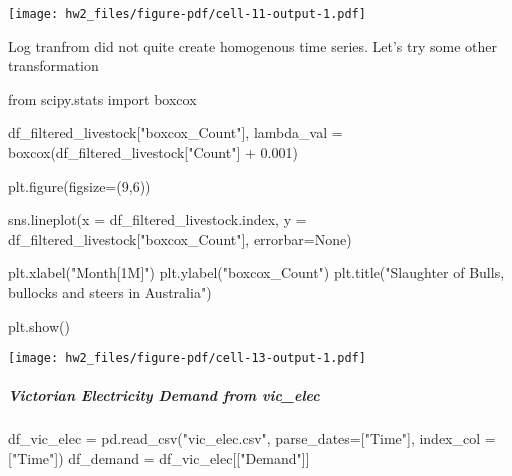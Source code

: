 \documentclass[
  11pt,
]{article}
\let\oldsubparagraph\subparagraph
\renewcommand{\subparagraph}[1]{\oldsubparagraph{#1}\mbox{}}
\newenvironment{Shaded}{\begin{snugshade}}{\end{snugshade}}
\newcommand{\DecValTok}[1]{\textcolor[rgb]{0.68,0.00,0.00}{#1}}
\newcommand{\FloatTok}[1]{\textcolor[rgb]{0.68,0.00,0.00}{#1}}
\newcommand{\ImportTok}[1]{\textcolor[rgb]{0.00,0.46,0.62}{#1}}
\newcommand{\NormalTok}[1]{\textcolor[rgb]{0.00,0.23,0.31}{#1}}
\newcommand{\OperatorTok}[1]{\textcolor[rgb]{0.37,0.37,0.37}{#1}}
\newcommand{\StringTok}[1]{\textcolor[rgb]{0.13,0.47,0.30}{#1}}
\newcommand{\VariableTok}[1]{\textcolor[rgb]{0.07,0.07,0.07}{#1}}
\begin{document}
\texttt{[image: hw2\_files/figure-pdf/cell-11-output-1.pdf]}

Log tranfrom did not quite create homogenous time series. Let's try some
other transformation

\n

\begin{Shaded}
\begin{Highlighting}[]
\ImportTok{from}\NormalTok{ scipy.stats }\ImportTok{import}\NormalTok{ boxcox}

\NormalTok{df\_filtered\_livestock[}\StringTok{"boxcox\_Count"}\NormalTok{], lambda\_val }\OperatorTok{=}\NormalTok{ boxcox(df\_filtered\_livestock[}\StringTok{"Count"}\NormalTok{] }\OperatorTok{+} \FloatTok{0.001}\NormalTok{)}
\end{Highlighting}
\end{Shaded}

\begin{Shaded}
\begin{Highlighting}[]
\NormalTok{plt.figure(figsize}\OperatorTok{=}\NormalTok{(}\DecValTok{9}\NormalTok{,}\DecValTok{6}\NormalTok{))}

\NormalTok{sns.lineplot(x }\OperatorTok{=}\NormalTok{ df\_filtered\_livestock.index, }
\NormalTok{             y }\OperatorTok{=}\NormalTok{ df\_filtered\_livestock[}\StringTok{"boxcox\_Count"}\NormalTok{], }
\NormalTok{             errorbar}\OperatorTok{=}\VariableTok{None}\NormalTok{)}

\NormalTok{plt.xlabel(}\StringTok{"Month[1M]"}\NormalTok{)}
\NormalTok{plt.ylabel(}\StringTok{"boxcox\_Count"}\NormalTok{)}
\NormalTok{plt.title(}\StringTok{"Slaughter of Bulls, bullocks and steers in Australia"}\NormalTok{)}

\NormalTok{plt.show()}
\end{Highlighting}
\end{Shaded}

\texttt{[image: hw2\_files/figure-pdf/cell-13-output-1.pdf]}

\subparagraph{Victorian Electricity Demand from
vic\_elec}\label{victorian-electricity-demand-from-vic_elec}

\begin{Shaded}
\begin{Highlighting}[]
\NormalTok{df\_vic\_elec }\OperatorTok{=}\NormalTok{ pd.read\_csv(}\StringTok{"vic\_elec.csv"}\NormalTok{, parse\_dates}\OperatorTok{=}\NormalTok{[}\StringTok{"Time"}\NormalTok{], index\_col }\OperatorTok{=}\NormalTok{ [}\StringTok{"Time"}\NormalTok{])}
\NormalTok{df\_demand }\OperatorTok{=}\NormalTok{ df\_vic\_elec[[}\StringTok{"Demand"}\NormalTok{]]}
\end{Highlighting}
\end{Shaded}
\end{document}

